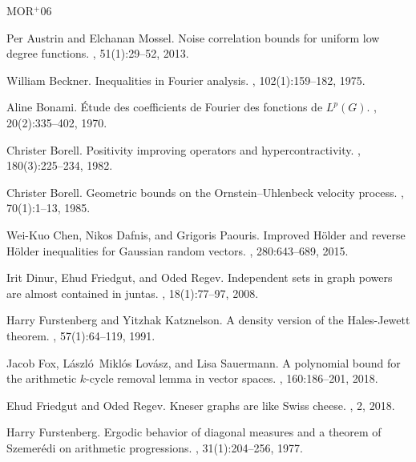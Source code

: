 \documentclass{daj}
\newcommand{\1}{\mathbbm{1}}
\theoremstyle{plain}
\theoremstyle{definition}
\begin{document}

\newcommand{\etalchar}[1]{$^{#1}$}
\begin{thebibliography}{MOR{\etalchar{+}}06}

Per Austrin and Elchanan Mossel.
\newblock Noise correlation bounds for uniform low degree functions.
, 51(1):29--52, 2013.

William Beckner.
\newblock Inequalities in {F}ourier analysis.
, 102(1):159--182, 1975.

Aline Bonami.
\newblock Étude des coefficients de {F}ourier des fonctions de {$L^p(G)$}.
, 20(2):335--402, 1970.

Christer Borell.
\newblock Positivity improving operators and hypercontractivity.
, 180(3):225--234, 1982.

Christer Borell.
\newblock Geometric bounds on the {Ornstein--Uhlenbeck} velocity process.
, 70(1):1--13, 1985.

{Wei-Kuo} Chen, Nikos Dafnis, and Grigoris Paouris.
\newblock Improved {H}ölder and reverse {H}ölder inequalities for {G}aussian
  random vectors.
, 280:643--689, 2015.

Irit Dinur, Ehud Friedgut, and Oded Regev.
\newblock Independent sets in graph powers are almost contained in juntas.
, 18(1):77--97, 2008.

Harry Furstenberg and Yitzhak Katznelson.
\newblock A density version of the {H}ales-{J}ewett theorem.
, 57(1):64--119, 1991.

Jacob Fox, László~Miklós Lovász, and Lisa Sauermann.
\newblock A polynomial bound for the arithmetic {$k$}-cycle removal lemma in
  vector spaces.
, 160:186--201, 2018.

Ehud Friedgut and Oded Regev.
\newblock Kneser graphs are like {S}wiss cheese.
, 2, 2018.

Harry Furstenberg.
\newblock Ergodic behavior of diagonal measures and a theorem of {S}zemerédi
  on arithmetic progressions.
, 31(1):204--256, 1977.


\end{thebibliography}
\end{document}

